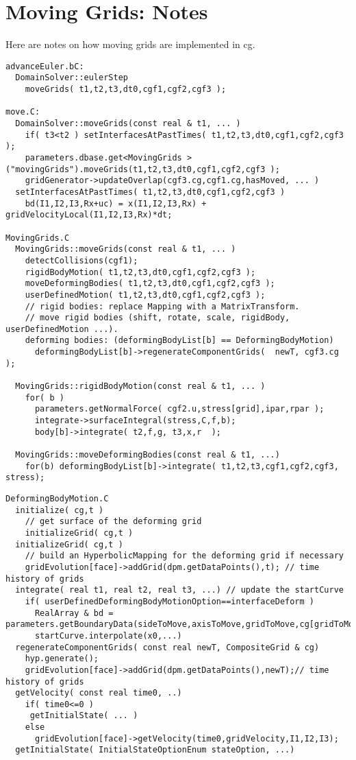 \section{Moving Grids: Notes}\label{sec:movingGrids}


Here are notes on how moving grids are implemented in cg.
{
\small
\begin{verbatim}
advanceEuler.bC: 
  DomainSolver::eulerStep 
    moveGrids( t1,t2,t3,dt0,cgf1,cgf2,cgf3 );

move.C:
  DomainSolver::moveGrids(const real & t1, ... )
    if( t3<t2 ) setInterfacesAtPastTimes( t1,t2,t3,dt0,cgf1,cgf2,cgf3 );
    parameters.dbase.get<MovingGrids >("movingGrids").moveGrids(t1,t2,t3,dt0,cgf1,cgf2,cgf3 );
    gridGenerator->updateOverlap(cgf3.cg,cgf1.cg,hasMoved, ... )
  setInterfacesAtPastTimes( t1,t2,t3,dt0,cgf1,cgf2,cgf3 )
    bd(I1,I2,I3,Rx+uc) = x(I1,I2,I3,Rx) + gridVelocityLocal(I1,I2,I3,Rx)*dt;

MovingGrids.C
  MovingGrids::moveGrids(const real & t1, ... )
    detectCollisions(cgf1);
    rigidBodyMotion( t1,t2,t3,dt0,cgf1,cgf2,cgf3 );
    moveDeformingBodies( t1,t2,t3,dt0,cgf1,cgf2,cgf3 );
    userDefinedMotion( t1,t2,t3,dt0,cgf1,cgf2,cgf3 );
    // rigid bodies: replace Mapping with a MatrixTransform.
    // move rigid bodies (shift, rotate, scale, rigidBody, userDefinedMotion ...).
    deforming bodies: (deformingBodyList[b] == DeformingBodyMotion)
      deformingBodyList[b]->regenerateComponentGrids(  newT, cgf3.cg );

  MovingGrids::rigidBodyMotion(const real & t1, ... )
    for( b )
      parameters.getNormalForce( cgf2.u,stress[grid],ipar,rpar );
      integrate->surfaceIntegral(stress,C,f,b);
      body[b]->integrate( t2,f,g, t3,x,r  );

  MovingGrids::moveDeformingBodies(const real & t1, ...)
    for(b) deformingBodyList[b]->integrate( t1,t2,t3,cgf1,cgf2,cgf3, stress);
\end{verbatim}
}
{\small
\begin{verbatim}
DeformingBodyMotion.C
  initialize( cg,t )
    // get surface of the deforming grid
    initializeGrid( cg,t )
  initializeGrid( cg,t )
    // build an HyperbolicMapping for the deforming grid if necessary
    gridEvolution[face]->addGrid(dpm.getDataPoints(),t); // time history of grids
  integrate( real t1, real t2, real t3, ...) // update the startCurve 
    if( userDefinedDeformingBodyMotionOption==interfaceDeform )
      RealArray & bd = parameters.getBoundaryData(sideToMove,axisToMove,gridToMove,cg[gridToMove]);
      startCurve.interpolate(x0,...) 
  regenerateComponentGrids( const real newT, CompositeGrid & cg)
    hyp.generate();
    gridEvolution[face]->addGrid(dpm.getDataPoints(),newT);// time history of grids
  getVelocity( const real time0, ..)
    if( time0<=0 )
     getInitialState( ... )
    else
      gridEvolution[face]->getVelocity(time0,gridVelocity,I1,I2,I3);
  getInitialState( InitialStateOptionEnum stateOption, ...)
\end{verbatim}
}
%   
